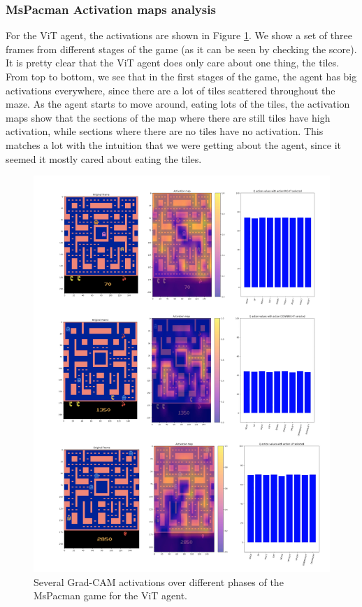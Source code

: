 \subsubsection{MsPacman Activation maps analysis}
For the ViT agent, the activations are shown in Figure \ref{fig:vitactivationmapsgradcamframe1}. We show a set of three frames from different stages of the game (as it can be seen by checking the score). It is pretty clear that the ViT agent does only care about one thing, the tiles. From top to bottom, we see that in the first stages of the game, the agent has big activations everywhere, since there are a lot of tiles scattered throughout the maze. As the agent starts to move around, eating lots of the tiles, the activation maps show that the sections of the map where there are still tiles have high activation, while sections where there are no tiles have no activation. This matches a lot with the intuition that we were getting about the agent, since it seemed it mostly cared about eating the tiles.

\begin{figure}[!h]
	\centering
	\includegraphics[width=0.7\linewidth]{figures/vit_activation_maps_grad_cam_frame1}
	\caption{Several Grad-CAM activations over different phases of the MsPacman game for the ViT agent.}
	\label{fig:vitactivationmapsgradcamframe1}
\end{figure}

